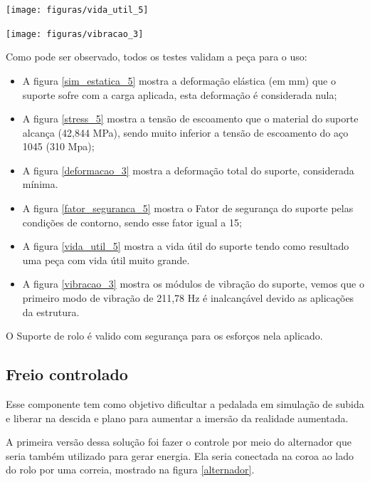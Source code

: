     \begin{center}
    	\texttt{[image: figuras/vida\_util\_5]}
        \label{vida_util_5}
    \end{center}

    \begin{center}
    	\texttt{[image: figuras/vibracao\_3]}
        \label{vibracao_3}
    \end{center}

Como pode ser observado, todos os testes validam a peça para o uso:
\begin{itemize}
    \item A figura \ref{sim_estatica_5} mostra a deformação elástica (em mm) que o suporte sofre com a carga aplicada, esta deformação é considerada nula;
    \item A figura \ref{stress_5} mostra a tensão de escoamento que o material do suporte alcança (42,844 MPa), sendo muito inferior a tensão de escoamento do aço 1045 (310 Mpa);
    \item A figura \ref{deformacao_3} mostra a deformação total do suporte, considerada mínima.
    \item A figura \ref{fator_seguranca_5} mostra o Fator de segurança do suporte pelas condições de contorno, sendo esse fator igual a 15;
    \item A figura \ref{vida_util_5} mostra a vida útil do suporte tendo como resultado uma peça com vida útil muito grande.
    \item A figura \ref{vibracao_3} mostra os módulos de vibração do suporte, vemos que o primeiro modo de vibração de 211,78 Hz é inalcançável devido as aplicações da estrutura.
\end{itemize}

O Suporte de rolo é valido com segurança para os esforços nela aplicado.

\subsection{Freio controlado} \label{freio.controlado}
    Esse componente tem como objetivo dificultar a pedalada em simulação de subida e liberar na descida e plano para aumentar a imersão da realidade aumentada.

    A primeira versão dessa solução foi fazer o controle por meio do alternador que seria também utilizado para gerar energia. Ela seria conectada na coroa ao lado do rolo por uma correia, mostrado na figura \ref{alternador}.


